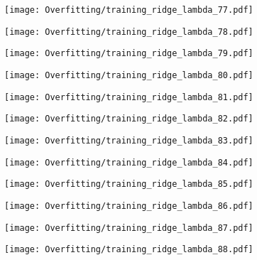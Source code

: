 \documentclass[xcolor=pdftex,dvipsnames,table]{beamer}
\begin{document}
\frame
{
	\begin{center}
		\texttt{[image: Overfitting/training\_ridge\_lambda\_77.pdf]}
	\end{center}
}

\frame
{
	\begin{center}
		\texttt{[image: Overfitting/training\_ridge\_lambda\_78.pdf]}
	\end{center}
}

\frame
{
	\begin{center}
		\texttt{[image: Overfitting/training\_ridge\_lambda\_79.pdf]}
	\end{center}
}

\frame
{
	\begin{center}
		\texttt{[image: Overfitting/training\_ridge\_lambda\_80.pdf]}
	\end{center}
}

\frame
{
	\begin{center}
		\texttt{[image: Overfitting/training\_ridge\_lambda\_81.pdf]}
	\end{center}
}

\frame
{
	\begin{center}
		\texttt{[image: Overfitting/training\_ridge\_lambda\_82.pdf]}
	\end{center}
}

\frame
{
	\begin{center}
		\texttt{[image: Overfitting/training\_ridge\_lambda\_83.pdf]}
	\end{center}
}

\frame
{
	\begin{center}
		\texttt{[image: Overfitting/training\_ridge\_lambda\_84.pdf]}
	\end{center}
}

\frame
{
	\begin{center}
		\texttt{[image: Overfitting/training\_ridge\_lambda\_85.pdf]}
	\end{center}
}

\frame
{
	\begin{center}
		\texttt{[image: Overfitting/training\_ridge\_lambda\_86.pdf]}
	\end{center}
}

\frame
{
	\begin{center}
		\texttt{[image: Overfitting/training\_ridge\_lambda\_87.pdf]}
	\end{center}
}

\frame
{
	\begin{center}
		\texttt{[image: Overfitting/training\_ridge\_lambda\_88.pdf]}
	\end{center}
}
\end{document}
